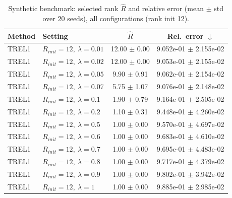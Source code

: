 \begin{table}[t]
\centering
\caption{Synthetic benchmark: selected rank \(\hat R\) and relative error (mean \(\pm\) std over \(20\) seeds), all configurations (rank init 12).}
\label{tab:results_synth_all}
\begin{tabular}{@{}llcc@{}}
\toprule
Method & Setting & \(\hat R\) & Rel.\ error \(\downarrow\) \\ \midrule
TREL1 & \(R_{init}=12,\ \lambda=0.01\) & 12.00 $\pm$ 0.00 & 9.052e-01 $\pm$ 2.155e-02 \\
TREL1 & \(R_{init}=12,\ \lambda=0.02\) & 12.00 $\pm$ 0.00 & 9.053e-01 $\pm$ 2.155e-02 \\
TREL1 & \(R_{init}=12,\ \lambda=0.05\) & 9.90 $\pm$ 0.91 & 9.062e-01 $\pm$ 2.154e-02 \\
TREL1 & \(R_{init}=12,\ \lambda=0.07\) & 5.75 $\pm$ 1.07 & 9.076e-01 $\pm$ 2.148e-02 \\
TREL1 & \(R_{init}=12,\ \lambda=0.1\) & 1.90 $\pm$ 0.79 & 9.164e-01 $\pm$ 2.505e-02 \\
TREL1 & \(R_{init}=12,\ \lambda=0.2\) & 1.10 $\pm$ 0.31 & 9.448e-01 $\pm$ 4.260e-02 \\
TREL1 & \(R_{init}=12,\ \lambda=0.5\) & 1.00 $\pm$ 0.00 & 9.570e-01 $\pm$ 4.697e-02 \\
TREL1 & \(R_{init}=12,\ \lambda=0.6\) & 1.00 $\pm$ 0.00 & 9.683e-01 $\pm$ 4.610e-02 \\
TREL1 & \(R_{init}=12,\ \lambda=0.7\) & 1.00 $\pm$ 0.00 & 9.695e-01 $\pm$ 4.483e-02 \\
TREL1 & \(R_{init}=12,\ \lambda=0.8\) & 1.00 $\pm$ 0.00 & 9.717e-01 $\pm$ 4.379e-02 \\
TREL1 & \(R_{init}=12,\ \lambda=0.9\) & 1.00 $\pm$ 0.00 & 9.802e-01 $\pm$ 3.942e-02 \\
TREL1 & \(R_{init}=12,\ \lambda=1\) & 1.00 $\pm$ 0.00 & 9.885e-01 $\pm$ 2.985e-02 \\
\bottomrule
\end{tabular}
\end{table}